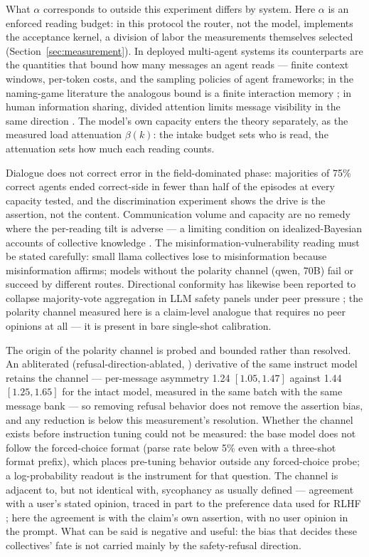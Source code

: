 \documentclass[11pt]{article}
\begin{document}
What $\alpha$ corresponds to outside this experiment differs by system. Here $\alpha$ is an enforced
reading budget: in this protocol the router, not the model, implements the
acceptance kernel, a division of labor the measurements themselves selected
(Section~\ref{sec:measurement}). In deployed multi-agent systems its
counterparts are the quantities that bound how many messages an agent
reads --- finite context windows, per-token costs, and the sampling policies
of agent frameworks; in the naming-game literature the analogous bound is a
finite interaction memory \citep{Flint2026}; in human information sharing,
divided attention limits message visibility in the same direction
\citep{HodasLerman2012}. The model's own capacity enters the theory
separately, as the measured load attenuation $\beta(k)$: the intake budget
sets who is read, the attenuation sets how much each reading counts.

Dialogue does not correct error in the field-dominated phase: majorities of
75\% correct agents ended correct-side in fewer than half of the episodes at
every capacity tested, and the discrimination experiment shows the drive is the assertion,
not the content. Communication volume and capacity are no remedy where the
per-reading tilt is adverse --- a limiting condition on idealized-Bayesian
accounts of collective knowledge \citep{Taniguchi2024}. The
misinformation-vulnerability reading must be stated carefully: small llama
collectives lose to misinformation because misinformation affirms; models
without the polarity channel (qwen, 70B) fail or succeed by different
routes. Directional conformity has likewise been reported to collapse
majority-vote aggregation in LLM safety panels under peer pressure
\citep{HuQu2026}; the polarity channel measured here is a claim-level
analogue that requires no peer opinions at all --- it is present in bare
single-shot calibration.

The origin of the polarity channel is probed and bounded rather than
resolved. An abliterated (refusal-direction-ablated, \citealp{Arditi2024})
derivative of the same instruct model retains the channel --- per-message
asymmetry 1.24 $[1.05, 1.47]$ against 1.44 $[1.25, 1.65]$ for the intact
model, measured in the same batch with the same message bank --- so removing
refusal behavior does not remove the assertion bias, and any reduction is
below this measurement's resolution. Whether the channel exists before
instruction tuning could not be measured: the base model does not follow the
forced-choice format (parse rate below 5\% even with a three-shot format
prefix), which places pre-tuning behavior outside any forced-choice probe; a
log-probability readout is the instrument for that question. The channel is
adjacent to, but not identical with, sycophancy as usually defined ---
agreement with a user's stated opinion, traced in part to the preference
data used for RLHF \citep{Sharma2023}; here the agreement is with the
claim's own assertion, with no user opinion in the prompt. What can be said
is negative and useful: the bias that decides these collectives' fate is not
carried mainly by the safety-refusal direction.
\end{document}
